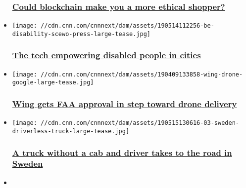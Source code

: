 \begin{itemize}
  \hypertarget{could-blockchain-make-you-a-more-ethical-shopper}{%
  \subsubsection{\texorpdfstring{\href{/2019/06/05/business/blockchain-traceability/index.html}{Could
  blockchain make you a more ethical
  shopper?}}{Could blockchain make you a more ethical shopper?}}\label{could-blockchain-make-you-a-more-ethical-shopper}}
\item
  \href{/2019/05/29/business/disability-technology-transport/index.html}{}

  \texttt{[image: //cdn.cnn.com/cnnnext/dam/assets/190514112256-be-disability-scewo-press-large-tease.jpg]}

  \hypertarget{the-tech-empowering-disabled-people-in-cities}{%
  \subsubsection{\texorpdfstring{\href{/2019/05/29/business/disability-technology-transport/index.html}{The
  tech empowering disabled people in
  cities}}{The tech empowering disabled people in cities}}\label{the-tech-empowering-disabled-people-in-cities}}
\item
  \href{/2019/04/23/tech/wing-faa-drone-delivery/index.html}{}

  \texttt{[image: //cdn.cnn.com/cnnnext/dam/assets/190409133858-wing-drone-google-large-tease.jpg]}

  \hypertarget{wing-gets-faa-approval-in-step-toward-drone-delivery-}{%
  \subsubsection{\texorpdfstring{\href{/2019/04/23/tech/wing-faa-drone-delivery/index.html}{Wing
  gets FAA approval in step toward drone delivery
  }}{Wing gets FAA approval in step toward drone delivery }}\label{wing-gets-faa-approval-in-step-toward-drone-delivery-}}
\item
  \href{/2019/05/15/tech/einride-self-driving-trucks/index.html}{}

  \texttt{[image: //cdn.cnn.com/cnnnext/dam/assets/190515130616-03-sweden-driverless-truck-large-tease.jpg]}

  \hypertarget{a-truck-without-a-cab-and-driver-takes-to-the-road-in-sweden}{%
  \subsubsection{\texorpdfstring{\href{/2019/05/15/tech/einride-self-driving-trucks/index.html}{A
  truck without a cab and driver takes to the road in
  Sweden}}{A truck without a cab and driver takes to the road in Sweden}}\label{a-truck-without-a-cab-and-driver-takes-to-the-road-in-sweden}}
\item
  \href{/2019/04/18/business/ai-vaak-shoplifting/index.html}{}


\end{itemize}
